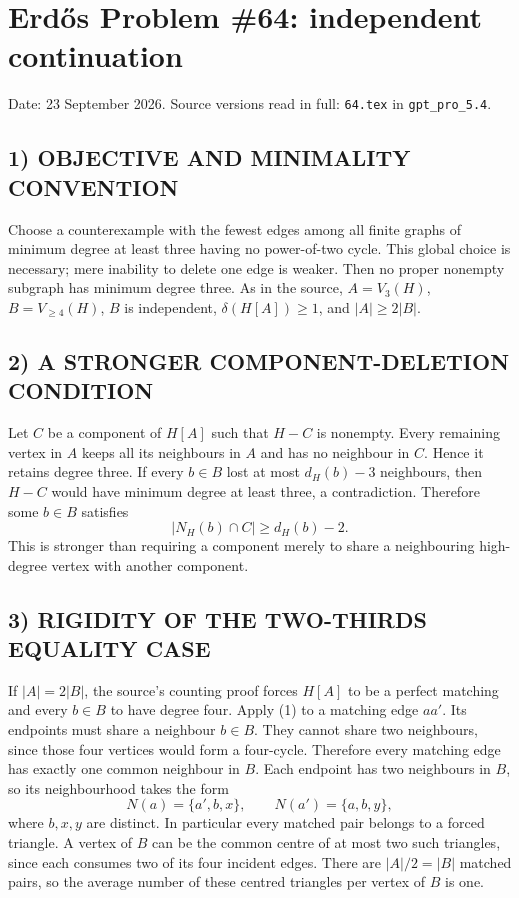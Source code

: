 \section{Erd\H{o}s Problem \#64: independent continuation}
\noindent Date: 23 September 2026. Source versions read in full: \texttt{64.tex} in \texttt{gpt\_pro\_5.4}.

\subsection*{1) OBJECTIVE AND MINIMALITY CONVENTION}
Choose a counterexample with the fewest edges among all finite graphs of minimum degree at least three having no power-of-two cycle. This global choice is necessary; mere inability to delete one edge is weaker. Then no proper nonempty subgraph has minimum degree three. As in the source, $A=V_3(H)$, $B=V_{\ge4}(H)$, $B$ is independent, $\delta(H[A])\ge1$, and $|A|\ge2|B|$.
\subsection*{2) A STRONGER COMPONENT-DELETION CONDITION}
Let $C$ be a component of $H[A]$ such that $H-C$ is nonempty. Every remaining vertex in $A$ keeps all its neighbours in $A$ and has no neighbour in $C$. Hence it retains degree three. If every $b\in B$ lost at most $d_H(b)-3$ neighbours, then $H-C$ would have minimum degree at least three, a contradiction. Therefore some $b\in B$ satisfies
\[
|N_H(b)\cap C|\ge d_H(b)-2. \tag{1}
\]
This is stronger than requiring a component merely to share a neighbouring high-degree vertex with another component.
\subsection*{3) RIGIDITY OF THE TWO-THIRDS EQUALITY CASE}
If $|A|=2|B|$, the source's counting proof forces $H[A]$ to be a perfect matching and every $b\in B$ to have degree four. Apply (1) to a matching edge $aa'$. Its endpoints must share a neighbour $b\in B$. They cannot share two neighbours, since those four vertices would form a four-cycle. Therefore every matching edge has exactly one common neighbour in $B$.
Each endpoint has two neighbours in $B$, so its neighbourhood takes the form
\[
N(a)=\{a',b,x\},\qquad N(a')=\{a,b,y\},
\]
where $b,x,y$ are distinct. In particular every matched pair belongs to a forced triangle. A vertex of $B$ can be the common centre of at most two such triangles, since each consumes two of its four incident edges. There are $|A|/2=|B|$ matched pairs, so the average number of these centred triangles per vertex of $B$ is one.
